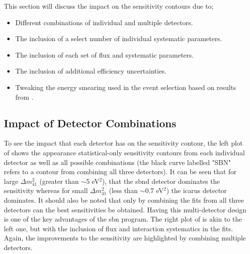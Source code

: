 This section will discuss the impact on the sensitivity contours due to;
\begin{itemize}
    \item Different combinations of individual and multiple detectors.
    \item The inclusion of a select number of individual systematic parameters. 
    \item The inclusion of each set of flux and systematic parameters.
    \item The inclusion of additional efficiency uncertainties.
    \item Tweaking the energy smearing used in the event selection based on results from .
\end{itemize}

\subsection{Impact of Detector Combinations}

To see the impact that each detector has on the sensitivity contour, the left plot of  shows the \nue appearance statistical-only sensitivity contours from each individual detector as well as all possible combinations (the black curve labelled "SBN" refers to a contour from combining all three detectors). It can be seen that for large $\Delta m^2_{41}$ (greater than $\sim$5 eV$^2$), that the \gls{sbnd} detector dominates the sensitivity whereas for small $\Delta m^2_{41}$ (less than $\sim$0.7 eV$^2$) the \gls{icarus} detector dominates. It should also be noted that only by combining the fits from all three detectors can the best sensitivities be obtained. Having this multi-detector design is one of the key advantages of the \gls{sbn} program. The right plot of  is akin to the left one, but with the inclusion of flux and interaction systematics in the fits. Again, the improvements to the sensitivity are highlighted by combining multiple detectors. 


